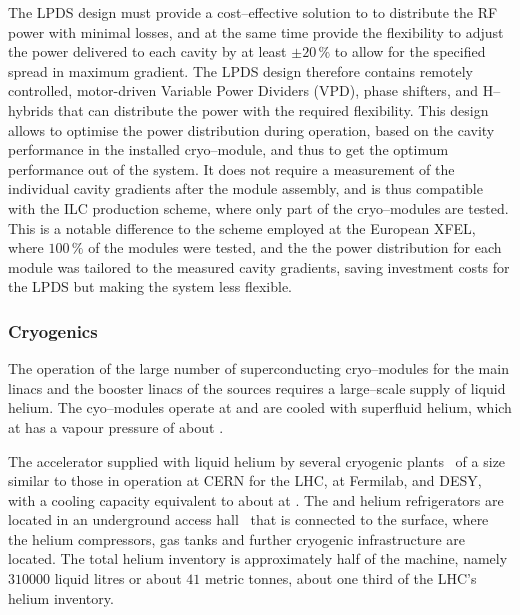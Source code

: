 The LPDS design must provide a cost--effective solution to to distribute the RF power with minimal losses, and at the same time provide the flexibility to adjust the power delivered to each cavity by at least $\pm20\,\%$ to allow for the specified spread in maximum gradient. 
The LPDS design therefore contains remotely controlled, motor-driven Variable Power Dividers (VPD), phase shifters, and H--hybrids that can distribute the power with the required flexibility.
This design allows to optimise the power distribution during operation, based on the cavity performance in the installed cryo--module, and thus to get the optimum performance out of the system.
It does not require a measurement of the individual cavity gradients after the module assembly, and is thus compatible with the ILC production scheme, where only part of the cryo--modules are tested.
This is a notable difference to the scheme employed at the European XFEL, where $100\,\%$ of the modules were tested, and the the power distribution for each module was tailored to the measured cavity gradients, saving investment costs for the LPDS but making the system less flexible.

\subsubsection{Cryogenics}

The operation of the large number of superconducting cryo--modules for the main linacs and the booster linacs of the sources requires a large--scale supply of liquid helium.
The cyo--modules operate at  and are cooled with superfluid helium, which at  has a vapour pressure of about .


The accelerator supplied with liquid helium by several cryogenic plants~\cite[Sec. 3.5]{Adolphsen:2013kya} of a size similar to those in operation at CERN for the LHC, at Fermilab, and DESY,
with a cooling capacity equivalent to about  at .
The  and  helium refrigerators are located in an underground access hall~\cite{bib:cr-0014} that is connected to the surface, where the helium compressors, gas tanks and further cryogenic infrastructure are located.
The total helium inventory is approximately half of the  machine, namely $310 000$ liquid litres or about $41$ metric tonnes, about one third of the LHC's helium inventory.



